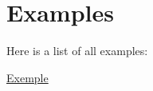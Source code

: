 \section{Examples}
Here is a list of all examples\+:\begin{DoxyCompactItemize}
\item 
\hyperlink{Exemple-example}{Exemple}
\end{DoxyCompactItemize}
